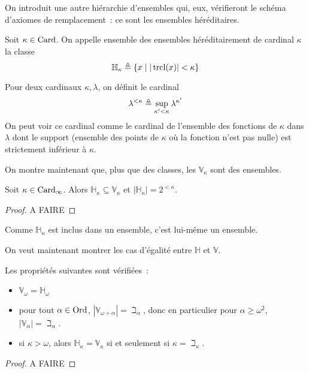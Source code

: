 On introduit une autre hiérarchie d'ensembles qui, eux, vérifieront le schéma
d'axiomes de remplacement~: ce sont les ensembles héréditaires.

\begin{definition}
  Soit $\kappa \in \operatorname{Card}$. On appelle ensemble des ensembles héréditairement de
  cardinal $\kappa$ la classe
  \[\mathbb H_\kappa \triangleq \{x \mid |\operatorname{trcl}(x)| < \kappa\}\]
\end{definition}

Pour deux cardinaux $\kappa,\lambda$, on définit le cardinal
\[\lambda^{<\kappa} \triangleq \sup_{\kappa' < \kappa} \lambda^{\kappa'}\]
On peut voir ce cardinal comme le cardinal de l'ensemble des fonctions de
$\kappa$ dans $\lambda$ dont le support (ensemble des points de $\kappa$ où la
fonction n'est pas nulle) est strictement inférieur à $\kappa$.

On montre maintenant que, plus que des classes, les $\mathbb V_\kappa$ sont des
ensembles.

\begin{proposition}
  Soit $\kappa\in\operatorname{Card}_\infty$. Alors $\mathbb H_\kappa\subseteq\mathbb V_\kappa$
  et  $|\mathbb H_\kappa| = 2^{<\kappa}$.
\end{proposition}

\begin{proof}
  A FAIRE
\end{proof}

Comme $\mathbb H_\kappa$ est inclus dans un ensemble, c'est lui-même un
ensemble.

On veut maintenant montrer les cas d'égalité entre $\mathbb H$ et $\mathbb V$.

\begin{property}
  Les propriétés suivantes sont vérifiées~:
  \begin{itemize}
  \item $\mathbb V_\omega = \mathbb H_\omega$
  \item pour tout $\alpha\in\operatorname{Ord}$, $|\mathbb V_{\omega + \alpha}| = \beth_\alpha$,
    donc en particulier pour $\alpha \geq \omega^2$,
    $|\mathbb V_\alpha| = \beth_\alpha$.
  \item si $\kappa > \omega$, alors $\mathbb H_\kappa = \mathbb V_\kappa$
    si et seulement si $\kappa = \beth_\kappa$.
  \end{itemize}
\end{property}

\begin{proof}
  A FAIRE
\end{proof}

